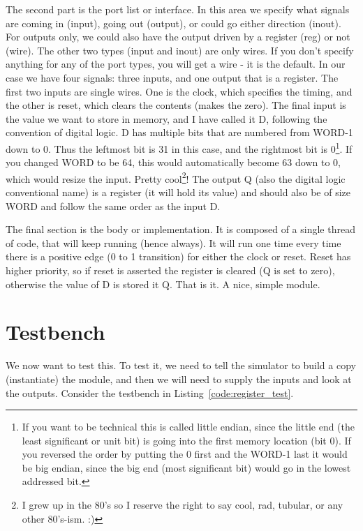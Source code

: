 The second part is the port list or interface.  In this area we specify what signals are coming in (input), going out (output), or could go either direction (inout).  For outputs only, we could also have the output driven by a register (reg) or not (wire).  The other two types (input and inout) are only wires.  If you don't specify anything for any of the port types, you will get a wire - it is the default.  In our case we have four signals: three inputs, and one output that is a register.  The first two inputs are single wires.  One is the clock, which specifies the timing, and the other is reset, which clears the contents (makes the zero).  The final input is the value we want to store in memory, and I have called it D, following the convention of digital logic.  D has multiple bits that are numbered from WORD-1 down to 0.  Thus the leftmost bit is 31 in this case, and the rightmost bit is 0\footnote{If you want to be technical this is called little endian, since the little end (the least significant or unit bit) is going into the first memory location (bit 0).  If you reversed the order by putting the 0 first and the WORD-1 last it would be big endian, since the big end (most significant bit) would go in the lowest addressed bit.}.  If you changed WORD to be 64, this would automatically become 63 down to 0, which would resize the input.  Pretty cool\footnote{I grew up in the 80's so I reserve the right to say cool, rad, tubular, or any other 80's-ism.  :) }!  The output Q (also the digital logic conventional name) is a register (it will hold its value) and should also be of size WORD and follow the same order as the input D.

The final section is the body or implementation.  It is composed of a single thread of code, that will keep running (hence always).  It will run one time every time there is a positive edge (0 to 1 transition) for either the clock or reset.  Reset has higher priority, so if reset is asserted the register is cleared (Q is set to zero), otherwise the value of D is stored it Q.  That is it.  A nice, simple module.

\section{Testbench}

We now want to test this.  To test it, we need to tell the simulator to build a copy (instantiate) the module, and then we will need to supply the inputs and look at the outputs.  Consider the testbench in Listing~\ref{code:register_test}.

